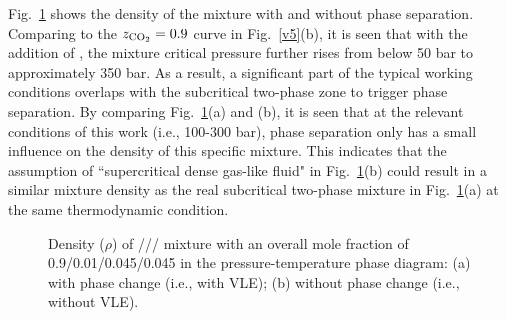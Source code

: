 


     Fig.~\ref{fig:PTdiagram_rho} shows the density of the mixture with and without phase separation. Comparing to the $z_{\ce{CO2}}=0.9$ curve in Fig.~\ref{v5}(b), it is seen that with the addition of , the mixture critical pressure further rises from below 50 bar to approximately 350 bar. As a result, a significant part of the typical working conditions overlaps with the subcritical two-phase zone to trigger phase separation. By comparing Fig.~\ref{fig:PTdiagram_rho}(a) and (b), it is seen that at the relevant conditions of this work (i.e., 100-300 bar), phase separation only has a small influence on the density of this specific mixture. This indicates that the assumption of ``supercritical dense gas-like fluid" in Fig.~\ref{fig:PTdiagram_rho}(b) could result in a similar mixture density as the real subcritical two-phase mixture in Fig.~\ref{fig:PTdiagram_rho}(a) at the same thermodynamic condition.

    \begin{figure}[htb]
        \centering


        \caption{Density ($\rho$) of /// mixture with an overall mole fraction of 0.9/0.01/0.045/0.045 in the pressure-temperature phase diagram: (a) with phase change (i.e., with VLE); (b) without phase change (i.e., without VLE).}
        \label{fig:PTdiagram_rho}
    \end{figure}

